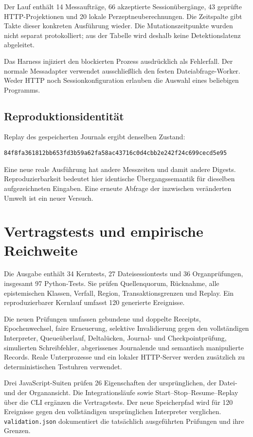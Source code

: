 \documentclass[11pt,a4paper]{article}
\newcommand{\nextsection}[2]{\clearpage{\color{accent}\small\textsf{#1}}\section{#2}}
\begin{document}
Der Lauf enthält 14 Messaufträge, 66 akzeptierte Sessionübergänge,
43 geprüfte HTTP-Projektionen und 20 lokale Perzeptneuberechnungen.
Die Zeitspalte gibt Takte dieser konkreten Ausführung wieder.
Die Mutationszeitpunkte wurden nicht separat protokolliert;
aus der Tabelle wird deshalb keine Detektionslatenz abgeleitet.

Das Harness injiziert den blockierten Prozess ausdrücklich als
Fehlerfall. Der normale Messadapter verwendet ausschließlich den
festen Dateiabfrage-Worker. Weder HTTP noch Sessionkonfiguration
erlauben die Auswahl eines beliebigen Programms.

\subsection{Reproduktionsidentität}
Replay des gespeicherten Journals ergibt denselben Zustand:
\begin{lstlisting}
84f8fa361812bb653fd3b59a62fa58ac43716c0d4cbb2e242f24c699cecd5e95
\end{lstlisting}
Eine neue reale Ausführung hat andere Messzeiten und damit
andere Digests. Reproduzierbarkeit bedeutet hier identische
Übergangssemantik für dieselben aufgezeichneten Eingaben.
Eine erneute Abfrage der inzwischen veränderten Umwelt
ist ein neuer Versuch.

\nextsection{20 / VERIFIKATION}{Vertragstests und empirische Reichweite}
Die Ausgabe enthält 34 Kerntests, 27 Dateisessiontests und 36
Organprüfungen, insgesamt 97 Python-Tests. Sie prüfen Quellenquorum,
Rücknahme, alle epistemischen Klassen, Verfall, Region,
Transaktionsgrenzen und Replay. Ein reproduzierbarer
Kernlauf umfasst 120 generierte Ereignisse.

Die neuen Prüfungen umfassen gebundene und doppelte Receipts,
Epochenwechsel, faire Erneuerung, selektive Invalidierung gegen
den vollständigen Interpreter, Queueüberlauf, Deltalücken,
Journal- und Checkpointprüfung, simulierten Schreibfehler,
abgerissenes Journalende und semantisch manipulierte Records.
Reale Unterprozesse und ein lokaler HTTP-Server werden
zusätzlich zu deterministischen Testuhren verwendet.

Drei JavaScript-Suiten prüfen 26 Eigenschaften der ursprünglichen,
der Datei- und der Organansicht. Die Integrationsläufe sowie
Start--Stop--Resume--Replay über die CLI ergänzen die Vertragstests.
Der neue Speicherpfad wird für 120 Ereignisse gegen den
vollständigen ursprünglichen Interpreter verglichen.
\texttt{validation.json} dokumentiert die tatsächlich
ausgeführten Prüfungen und ihre Grenzen.
\end{document}

